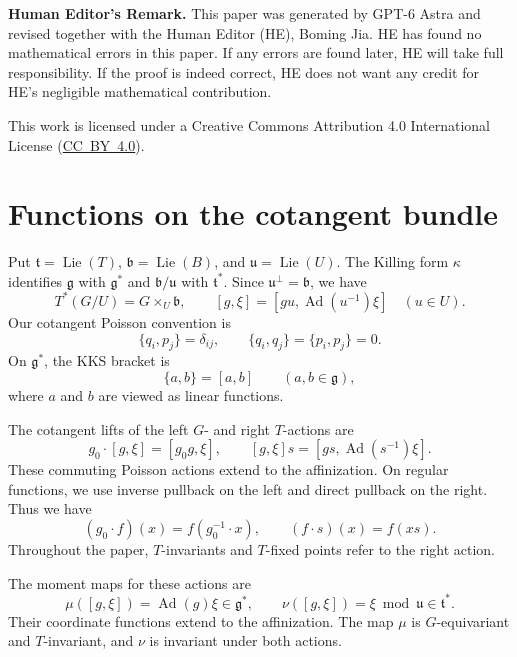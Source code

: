 \documentclass[12pt]{article}
\theoremstyle{paperplain}
\theoremstyle{paperdefinition}
\DeclareMathOperator{\Ad}{Ad}
\newcommand{\g}{\mathfrak g}
\newcommand{\tfrak}{\mathfrak t}
\begin{document}
\medskip
\noindent\textbf{Human Editor's Remark.}
This paper was generated by GPT-6 Astra and revised together with the Human Editor (HE), Boming Jia.
HE has found no mathematical errors in this paper.
If any errors are found later, HE will take full responsibility.
If the proof is indeed correct, HE does not want any credit for HE's negligible mathematical contribution.
\par\vspace{0.5em}
\noindent This work is licensed under a Creative Commons Attribution 4.0
International License (\mbox{\href{https://creativecommons.org/licenses/by/4.0/}{CC BY 4.0}}).

\setlength{\abovedisplayskip}{7pt plus 2pt minus 2pt}
\setlength{\belowdisplayskip}{7pt plus 2pt minus 2pt}
\setlength{\abovedisplayshortskip}{0pt plus 2pt}
\setlength{\belowdisplayshortskip}{5pt plus 2pt minus 2pt}
\newpage
\vspace{2em}
\section{Functions on the cotangent bundle}\label{sec:functions}

Put $\tfrak=\operatorname{Lie}(T)$, $\mathfrak b=\operatorname{Lie}(B)$, and $\mathfrak u=\operatorname{Lie}(U)$. The Killing form $\kappa$ identifies $\g$ with $\g^*$ and $\mathfrak b/\mathfrak u$ with $\tfrak^*$. Since $\mathfrak u^\perp=\mathfrak b$, we have
$$
    T^*(G/U)=G\times_U\mathfrak b,\qquad
    [g,\xi]=[gu,\Ad(u^{-1})\xi]\quad(u\in U).
$$
Our cotangent Poisson convention is
$$
    \{q_i,p_j\}=\delta_{ij},\qquad
    \{q_i,q_j\}=\{p_i,p_j\}=0.
$$
On $\g^*$, the KKS bracket is
$$
    \{a,b\}=[a,b]\qquad(a,b\in\g),
$$
where $a$ and $b$ are viewed as linear functions.

The cotangent lifts of the left $G$- and right $T$-actions are
$$
    g_0\cdot[g,\xi]=[g_0g,\xi],\qquad
    [g,\xi]s=[gs,\Ad(s^{-1})\xi].
$$
These commuting Poisson actions extend to the affinization. On regular functions, we use inverse pullback on the left and direct pullback on the right. Thus we have
$$
    (g_0\cdot f)(x)=f(g_0^{-1}\cdot x),\qquad
    (f\cdot s)(x)=f(xs).
$$
Throughout the paper, $T$-invariants and $T$-fixed points refer to the right action.

The moment maps for these actions are
$$
    \mu([g,\xi])=\Ad(g)\xi\in\g^*,\qquad
    \nu([g,\xi])=\xi\bmod\mathfrak u\in\tfrak^*.
$$
Their coordinate functions extend to the affinization. The map $\mu$ is $G$-equivariant and $T$-invariant, and $\nu$ is invariant under both actions.
\end{document}
